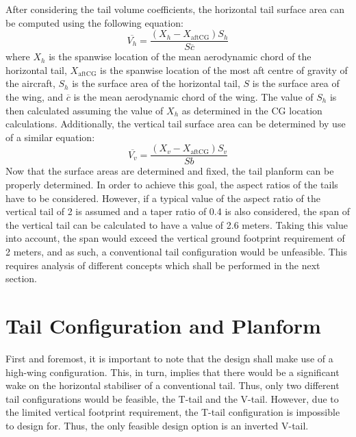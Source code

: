 After considering the tail volume coefficients, the horizontal tail surface area can be computed using the following equation:
\begin{equation}
    \overline{V_h}=\frac{(X_h-X_\text{aftCG})S_h}{S\overline{c}}
\end{equation}
where $X_h$ is the spanwise location of the mean aerodynamic chord of the horizontal tail, $X_\text{aftCG}$ is the spanwise location of the most aft centre of gravity of the aircraft, $S_h$ is the surface area of the horizontal tail, $S$ is the surface area of the wing, and $\overline{c}$ is the mean aerodynamic chord of the wing.
The value of $S_h$ is then calculated assuming the value of $X_h$ as determined in the CG location calculations.
Additionally, the vertical tail surface area can be determined by use of a similar equation:
\begin{equation}
    \overline{V_v}=\frac{(X_v-X_\text{aftCG})S_v}{Sb}
\end{equation} 
Now that the surface areas are determined and fixed, the tail planform can be properly determined.
In order to achieve this goal, the aspect ratios of the tails have to be considered.
However, if a typical value of the aspect ratio of the vertical tail of 2 is assumed \cite{HAW_9} and a taper ratio of 0.4 is also considered, the span of the vertical tail can be calculated to have a value of 2.6 meters.
Taking this value into account, the span would exceed the vertical ground footprint requirement of 2 meters, and as such, a conventional tail configuration would be unfeasible.
This requires analysis of different concepts which shall be performed in the next section.

\section{Tail Configuration and Planform }
\label{sec:tail_config}
First and foremost, it is important to note that the design shall make use of a high-wing configuration.
This, in turn, implies that there would be a significant wake on the horizontal stabiliser of a conventional tail.
Thus, only two different tail configurations would be feasible, the T-tail and the V-tail.
However, due to the limited vertical footprint requirement, the T-tail configuration is impossible to design for. Thus, the only feasible design option is an inverted V-tail.

